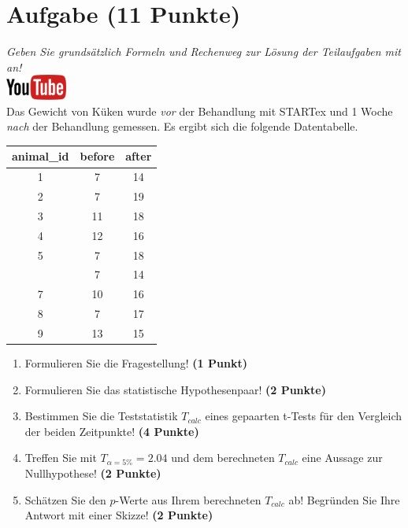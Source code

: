 \documentclass[a4paper, 10pt]{scrartcl}\usepackage[]{graphicx}\usepackage[]{xcolor}
\begin{document}
\section{Aufgabe \hfill (11 Punkte)}

\textit{Geben Sie grunds{\"a}tzlich Formeln und Rechenweg zur L{\"o}sung der
  Teilaufgaben mit an!} \\[1Ex]

\hfill\href{https://youtu.be/QR90zyn0Iz8}{\includegraphics[width =
  2cm]{img/youtube}}\\[1Ex]


Das Gewicht von K{\"u}ken wurde \textit{vor} der Behandlung mit STARTex und 1
Woche \textit{nach} der Behandlung gemessen. Es ergibt sich die folgende
Datentabelle.

\begin{table}[!h]
\centering
\begin{tabular}{ccc}
\toprule
animal\_id & before & after\\
\midrule
1 & 7 & 14\\
2 & 7 & 19\\
3 & 11 & 18\\
4 & 12 & 16\\
5 & 7 & 18\\
\addlinespace
6 & 7 & 14\\
7 & 10 & 16\\
8 & 7 & 17\\
9 & 13 & 15\\
\bottomrule
\end{tabular}
\end{table}



\begin{enumerate}
\item Formulieren Sie die Fragestellung! \textbf{(1 Punkt)}
\item Formulieren Sie das statistische Hypothesenpaar! \textbf{(2
    Punkte)}
\item Bestimmen Sie die Teststatistik $T_{calc}$ eines gepaarten t-Tests f{\"u}r den
  Vergleich der beiden Zeitpunkte! \textbf{(4 Punkte)}
\item Treffen Sie mit $T_{\alpha = 5\%} = 2.04$ und dem berechneten $T_{calc}$ eine Aussage
  zur Nullhypothese! \textbf{(2 Punkte)}
\item Sch{\"a}tzen Sie den $p$-Werte aus Ihrem berechneten $T_{calc}$ ab!
  Begr{\"u}nden Sie Ihre Antwort mit einer Skizze! \textbf{(2
    Punkte)}
\end{enumerate} 
\clearpage
\end{document}
